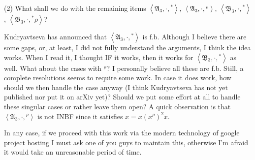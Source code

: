 \documentclass[11pt,reqno]{amsart}
\numberwithin{equation}{section}
\theoremstyle{remark}
\def\A{\mathfrak{A}}
\def\B{\mathfrak{B}}
\begin{document}
(2) What shall we do with the remaining items $\left<\A_3,\cdot,{}^*\right>$,  $\left<\A_3,\cdot,{}^\rho\right>$, $\left<\B_3,\cdot,{}^*\right>$, $\left<\B_3,\cdot,{}^*\rho\right>$?


Kudryavtseva has announced that $\left<\A_3,\cdot,{}^*\right>$ is f.b. Although I believe there are some gaps, or, at least, I did not fully understand the arguments, I think the idea works. When I read it, I thought IF it works, then it works for $\left<\B_3,\cdot,{}^*\right>$ as well. What about the cases with ${}^\rho$? I personally believe all these are f.b. Still, a complete resolutions seems to require some work. In case it does work, how should we then handle the case anyway (I think Kudryavtseva has not yet published nor put it on arXiv yet)? Should
we  put some effort at all to handle these singular cases or rather leave them open? A quick observation is that $\left<\A_3,\cdot,{}^\rho\right>$ is not INBF since it satisfies $x=x(x^\rho)^2x$.

In any case, if we proceed with this work via the modern technology of google project hosting I must ask one of you  guys to maintain this, otherwise I'm afraid it would take an unreasonable period of time.
\end{document}
